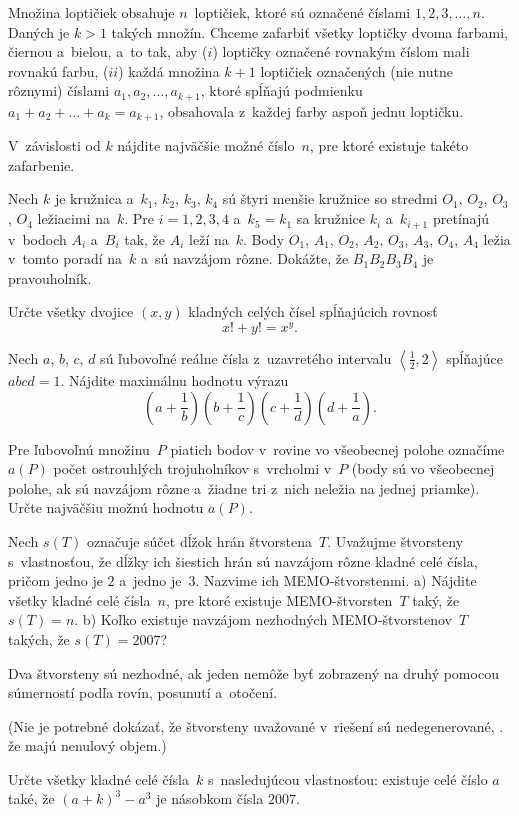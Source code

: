 {%
Množina loptičiek obsahuje $n$~loptičiek, ktoré sú označené číslami $1, 2, 3, \ldots, n$. Daných je $k>1$ takých množín. Chceme zafarbiť všetky loptičky dvoma farbami, čiernou a~bielou, a~to tak, aby
 \ite ($i$) loptičky označené rovnakým číslom mali rovnakú farbu,
 \ite ($ii$) každá množina $k+1$ loptičiek označených (nie nutne rôznymi) číslami $a_1, a_2, \ldots, a_{k+1}$, ktoré spĺňajú podmienku $a_1+a_2+\ldots+a_k=a_{k+1}$, obsahovala z~každej farby aspoň jednu loptičku.

\noindent
V~závislosti od $k$ nájdite najväčšie možné číslo~$n$, pre ktoré existuje takéto zafarbenie.}

{%
Nech $k$ je kružnica a~$k_1$, $k_2$, $k_3$, $k_4$ sú štyri menšie kružnice so stredmi $O_1$, $O_2$, $O_3$, $O_4$ ležiacimi na~$k$. Pre $i=1,2,3,4$ a~$k_5=k_1$ sa kružnice $k_i$ a~$k_{i+1}$ pretínajú v~bodoch $A_i$ a~$B_i$ tak, že $A_i$ leží na~$k$. Body $O_1$, $A_1$, $O_2$, $A_2$, $O_3$, $A_3$, $O_4$, $A_4$ ležia v~tomto poradí na~$k$ a~sú navzájom rôzne. Dokážte, že $B_1B_2B_3B_4$ je pravouholník.}

{%
Určte všetky dvojice $(x,y)$ kladných celých čísel spĺňajúcich rovnosť
$$
x!+y!=x^y.
$$}

{%
Nech $a$, $b$, $c$, $d$ sú ľubovoľné reálne čísla z~uzavretého intervalu $\left\langle\frac12,2\right\rangle$ spĺňajúce $abcd=1$. Nájdite maximálnu hodnotu výrazu
$$
\left(a+\frac1b\right)\left(b+\frac1c\right)\left(c+\frac1d\right)\left(d+\frac1a\right).
$$}

{%
Pre ľubovoľnú množinu~$P$ piatich bodov v~rovine vo všeobecnej polohe označíme $a(P)$ počet ostrouhlých trojuholníkov s~vrcholmi v~$P$ (body sú vo všeobecnej polohe, ak sú navzájom rôzne a~žiadne tri z~nich neležia na jednej priamke). Určte najväčšiu možnú hodnotu $a(P)$.}

{%
Nech $s(T)$ označuje súčet dĺžok hrán štvorstena~$T$. Uvažujme štvorsteny s~vlastnosťou, že dĺžky ich šiestich hrán sú navzájom rôzne kladné celé čísla, pričom jedno je $2$ a~jedno je~$3$. Nazvime ich MEMO-štvorstenmi.
    \ite a) Nájdite všetky kladné celé čísla~$n$, pre ktoré existuje MEMO-štvorsten~$T$ taký, že $s(T) = n$.
    \ite b) Koľko existuje navzájom nezhodných MEMO-štvorstenov~$T$ takých, že $s(T)=2007$?

\noindent
Dva štvorsteny sú nezhodné, ak jeden nemôže byť zobrazený na druhý pomocou súmerností podľa rovín, posunutí a~otočení.

(Nie je potrebné dokázať, že štvorsteny uvažované v~riešení sú nedegenerované, \tj. že majú nenulový objem.)}

{%
Určte všetky kladné celé čísla~$k$ s~nasledujúcou vlastnosťou: existuje celé číslo $a$ také, že $(a+k)^3-a^3$ je násobkom čísla $2007$.}

